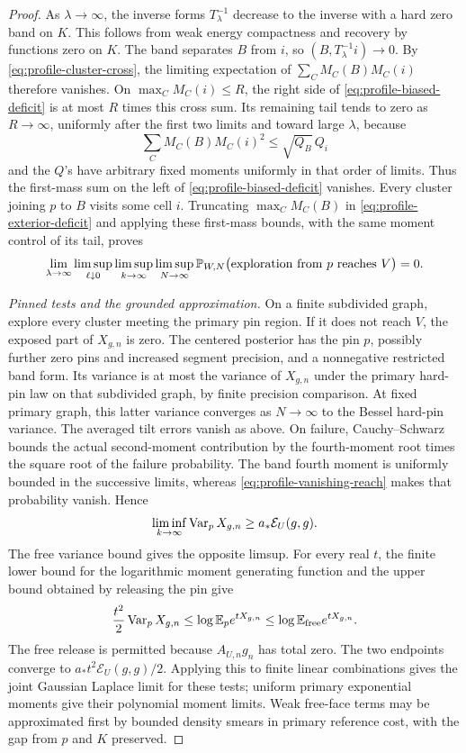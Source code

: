 \begin{proof}
As \(\lambda\to\infty\), the inverse forms \(T_\lambda^{-1}\)
decrease to the inverse with a hard zero band on \(K\).  This follows
from weak energy compactness and recovery by functions zero on \(K\).
The band separates \(B\) from \(i\), so
\((B,T_\lambda^{-1}i)\to0\).  By
\eqref{eq:profile-cluster-cross}, the limiting expectation of
\(\sum_CM_C(B)M_C(i)\) therefore vanishes.  On
\(\max_CM_C(i)\le R\), the right side of
\eqref{eq:profile-biased-deficit} is at most \(R\) times this cross
sum.  Its remaining tail tends to zero as \(R\to\infty\), uniformly
after the first two limits and toward large \(\lambda\), because
\[
              \sum_CM_C(B)M_C(i)^2\le\sqrt{Q_B}\,Q_i
\]
and the \(Q\)'s have arbitrary fixed moments uniformly in that
order of limits.  Thus the first-mass sum on the left of
\eqref{eq:profile-biased-deficit} vanishes.  Every cluster joining
\(p\) to \(B\) visits some cell \(i\).  Truncating
\(\max_CM_C(B)\) in \eqref{eq:profile-exterior-deficit} and applying
these first-mass bounds, with the same moment control of its tail,
proves
\begin{equation}\label{eq:profile-vanishing-reach}
 \lim_{\lambda\to\infty}\limsup_{\ell\downarrow0}
 \limsup_{k\to\infty}\limsup_{N\to\infty}
 \mathbb P_{W,N}\bigl(\text{exploration from }p
                     \text{ reaches }V\bigr)=0.
\end{equation}

\emph{Pinned tests and the grounded approximation.}
On a finite subdivided graph, explore every cluster meeting the
primary pin region.  If it does
not reach \(V\), the exposed part of \(X_{g,n}\) is zero.
The centered posterior has the pin \(p\), possibly further zero
pins and increased segment precision, and a nonnegative restricted
band form.  Its variance is at most the variance of \(X_{g,n}\)
under the primary hard-pin law on that subdivided graph, by finite
precision comparison.  At fixed primary graph, this latter variance
converges as \(N\to\infty\) to the Bessel hard-pin variance.
The averaged tilt errors vanish as above.  On failure,
Cauchy--Schwarz bounds the actual second-moment contribution by
the fourth-moment root times the square root of the failure
probability.  The band fourth moment is uniformly bounded in the
successive limits, whereas \eqref{eq:profile-vanishing-reach}
makes that probability vanish.  Hence
\[
 \liminf_{k\to\infty}\operatorname{Var}_p X_{g,n}
                   \ge a_*\mathcal E_U(g,g).
\]
The free variance bound gives the opposite limsup.  For every real
\(t\), the finite lower bound for the logarithmic moment generating
function and the upper bound obtained by releasing the pin give
\[
 \frac{t^2}{2}\operatorname{Var}_p X_{g,n}
       \le \log\mathbb E_p e^{tX_{g,n}}
       \le \log\mathbb E_{\rm free}e^{tX_{g,n}}.
\]
The free release is permitted because \(A_{U,n}g_n\) has total zero.
The two endpoints converge to \(a_*t^2\mathcal E_U(g,g)/2\).
Applying this to finite linear combinations gives the joint
Gaussian Laplace limit for these tests; uniform primary exponential
moments give their polynomial moment limits.  Weak free-face terms
may be approximated first by bounded density smears in primary
reference cost, with the gap from \(p\) and \(K\) preserved.


\end{proof}

